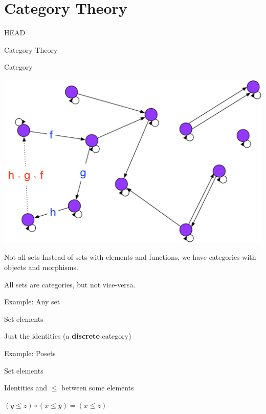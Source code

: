\documentclass[utf8x,notes,17pt]{beamer}
\newcommand{\head}[1]{\begin{center}
\vspace{13mm}\hspace{-1mm}\Huge{{#1}}
\end{center}}
\begin{document}
\section{Category Theory}
\label{sec-12}
\begin{frame}[fragile,plain,label=sec-12-1]{HEAD}
\head{Category Theory}
\end{frame}
\begin{frame}[fragile,label=sec-12-2]{Category}
\begin{center}
\includegraphics[width=.9\linewidth]{images/Category1.pdf}
\end{center}
\end{frame}
\begin{frame}[fragile,label=sec-12-3]{Not all sets}
Instead of sets with elements and functions, we have categories with objects
and morphisms.

\vspace{2ex}All sets are categories, but not vice-versa.
\end{frame}
\begin{frame}[fragile,label=sec-12-4]{Example: Any set}
\begin{description}[style=nextline]
  \item[Objects]   Set elements
  \item[Morphisms] Just the identities (a \textbf{discrete} category)
\end{description}
\end{frame}
\begin{frame}[fragile,label=sec-12-5]{Example: Posets}
\begin{description}[style=nextline]
  \item[Objects]     Set elements
  \item[Morphisms]   Identities and $≤$ between some elements
  \item[Composition] {\small $(y ≤ z) ∘ (x ≤ y) = (x ≤ z)$}
\end{description}
\end{frame}
\end{document}

